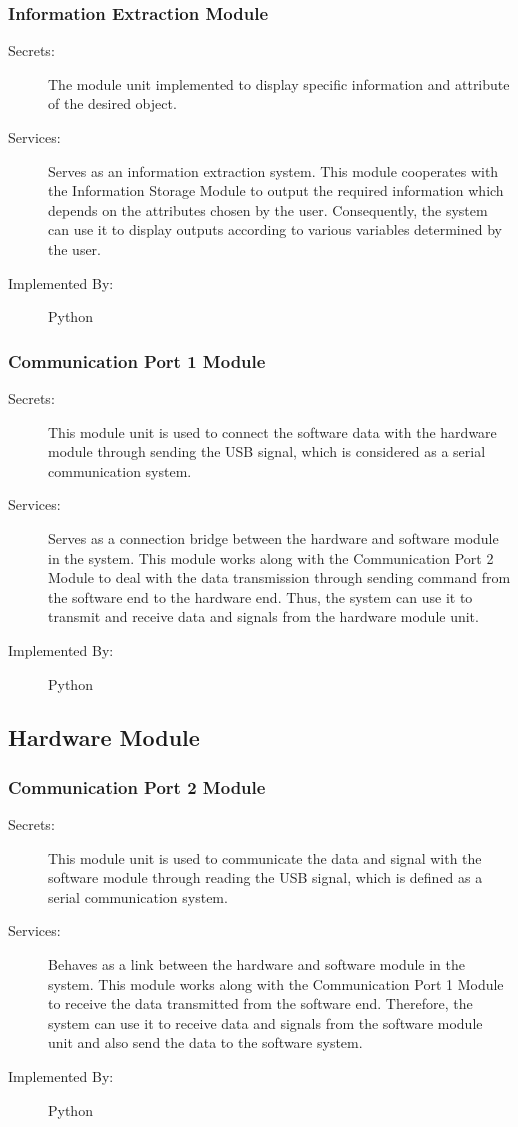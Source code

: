 \documentclass[12pt, titlepage]{article}
\begin{document}
\subsubsection{Information Extraction Module}
\begin{description}
\item[Secrets:]The module unit implemented to display specific information and attribute of the desired object.
\item[Services:]Serves as an information extraction system. This module cooperates with the Information Storage Module to output the required information which depends on the attributes chosen by the user. Consequently, the system can use it to display outputs according to various variables determined by the user.
\item[Implemented By:] Python
\end{description}
\subsubsection{Communication Port 1 Module}
\begin{description}
\item[Secrets:]This module unit is used to connect the software data with the hardware module through sending the USB signal, which is considered as a serial communication system.
\item[Services:]Serves as a connection bridge between the hardware and software module in the system. This module works along with the Communication Port 2 Module to deal with the data transmission through sending command from the software end to the hardware end. Thus, the system can use it to transmit and receive data and signals from the hardware module unit.
\item[Implemented By:] Python
\end{description}

\subsection{Hardware Module}

\subsubsection{Communication Port 2 Module}
\begin{description}
\item[Secrets:] This module unit is used to communicate the data and signal with the software module through reading the USB signal, which is defined as a serial communication system.
\item[Services:]Behaves as a link between the hardware and software module in the system. This module works along with the Communication Port 1 Module to receive the data transmitted from the software end. Therefore, the system can use it to receive data and signals from the software module unit and also send the data to the software system.
\item[Implemented By:] Python
\end{description}
\end{document}
